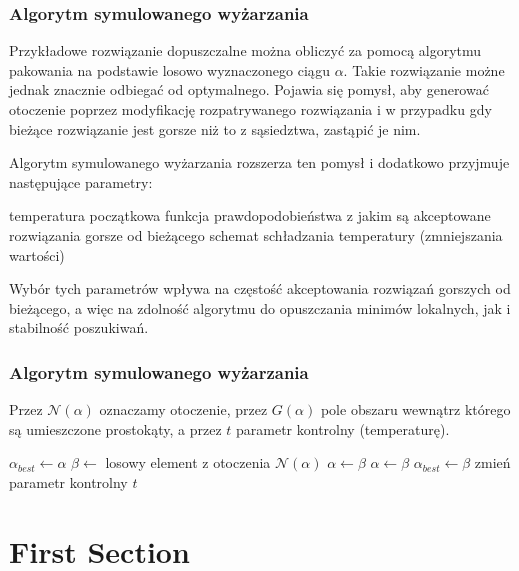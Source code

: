 \documentclass{beamer}
\begin{document}
\begin{frame}
    \frametitle{Algorytm symulowanego wyżarzania}
    Przykładowe rozwiązanie dopuszczalne można obliczyć za pomocą algorytmu pakowania na
    podstawie losowo wyznaczonego ciągu $\alpha.$ Takie rozwiązanie możne jednak znacznie
    odbiegać od optymalnego. Pojawia się pomysł, aby generować otoczenie poprzez modyfikację
    rozpatrywanego rozwiązania i w przypadku gdy bieżące rozwiązanie jest gorsze niż to z
    sąsiedztwa, zastąpić je nim.
    
    Algorytm symulowanego wyżarzania rozszerza ten pomysł i dodatkowo przyjmuje następujące
    parametry:
    \begin{outline}
        \1 temperatura początkowa
        \1 funkcja prawdopodobieństwa z jakim są akceptowane rozwiązania gorsze od bieżącego
        \1 schemat schładzania temperatury (zmniejszania wartości)
    \end{outline}
    Wybór tych parametrów wpływa na częstość akceptowania rozwiązań gorszych od bieżącego,
    a więc na zdolność algorytmu do opuszczania minimów lokalnych, jak i stabilność poszukiwań.
    
\end{frame}

\begin{frame}
    \frametitle{Algorytm symulowanego wyżarzania}
    Przez $\mathcal{N}(\alpha)$ oznaczamy otoczenie, przez $G(\alpha)$ pole obszaru wewnątrz
    którego są umieszczone prostokąty, a przez $t$ parametr kontrolny (temperaturę).
    
    \begin{algorithmic}
        \State $\alpha_{best}\gets\alpha$
        \Repeat
            \Repeat
            \State $\beta\gets$ losowy element z otoczenia $\mathcal{N}(\alpha)$
             $\alpha\gets\beta$
            \Else
                 $\alpha\gets\beta$
                \EndIf
            \EndIf
             $\alpha_{best}\gets\beta$
            \EndIf
            \State zmień parametr kontrolny $t$
    \end{algorithmic}
\end{frame}

\section{First Section} %
\end{document}
